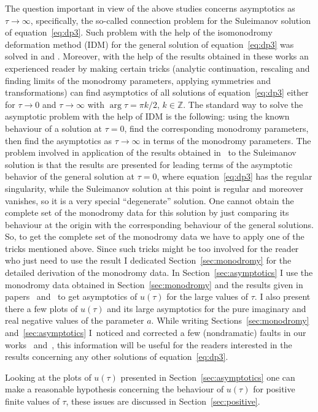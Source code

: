 \documentclass[pdftex]{sigma}
\numberwithin{equation}{section}
\begin{document}
The question important in view of the above studies concerns asymptotics as $\tau\to\infty$, speci\-fi\-cal\-ly,
the so-called connection problem for the Suleimanov solution of equation~\eqref{eq:dp3}.
Such problem with the help of the isomonodromy deformation method (IDM) for the general solution of
equation~\eqref{eq:dp3} was solved in \cite{KV2004} and \cite{KV2010}. Moreover, with the help of the
results obtained in these works an experienced reader by making certain tricks (analytic continuation,
rescaling and finding limits of the monodromy parameters, applying symmetries and transformations) can
find asymptotics of all solutions of equation~\eqref{eq:dp3} either for $\tau\to0$ and $\tau\to\infty$ with
$\arg\tau=\pi k/2$, $k\in\mathbb Z$.
The standard way to solve the asymptotic problem with the help of IDM
is the following: using the known behaviour of a solution at $\tau=0$, find the corresponding monodromy
parameters, then find the asymptotics as $\tau\to\infty$ in terms of
the monodromy parameters. The problem involved in
application of the results obtained in~\cite{KV2004} to the Suleimanov solution is that the
results are presented for leading terms of the asymptotic behavior of the general solution at $\tau=0$,
where equation~\eqref{eq:dp3} has the regular singularity, while the Suleimanov solution at this point is regular
and moreover vanishes, so it is a very special ``degenerate'' solution. One cannot obtain the complete set of
the monodromy data for this solution by just comparing its behaviour at the origin with the corresponding
behaviour of the general solutions. So, to get the complete set of the monodromy data we have to apply one of
the tricks mentioned above. Since such tricks might be too involved for the reader who just need to use the result
I dedicated Section~\ref{sec:monodromy} for the detailed derivation of the monodromy data.
In Section~\ref{sec:asymptotics} I use the monodromy data obtained in Section~\ref{sec:monodromy} and
the results given in papers~\cite{KV2004} and~\cite{KV2010} to get asymptotics of $u(\tau)$ for the large values
of $\tau$. I also present there a few plots of $u(\tau)$ and its large asymptotics for the pure imaginary and
real negative values of the parameter $a$. While writing Sections~\ref{sec:monodromy} and~\ref{sec:asymptotics}
I~noticed and corrected a few (nondramatic) faults in our works~\cite{KV2004} and~\cite{KV2010}, this information
will be useful for the readers interested in the results concerning any other solutions of equation~\eqref{eq:dp3}.

Looking at the plots of $u(\tau)$ presented in Section~\ref{sec:asymptotics} one can make a reasonable hypothesis
concerning the behaviour of $u(\tau)$ for positive finite values of $\tau$, these issues are discussed in
Section~\ref{sec:positive}.
\end{document}
